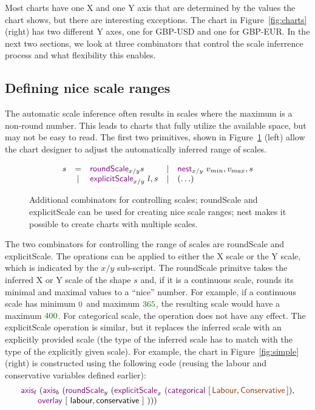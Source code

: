 \documentclass{jfp}
\newcommand{\num}[1]{\textcolor{numclr}{#1}}
\newcommand{\strf}[1]{\textnormal{\textcolor{strclr}{\sffamily #1}}}
\newcommand{\ident}[1]{\textnormal{\textcolor{idclr}{\sffamily #1}}}
\newcommand{\kvd}[1]{\textnormal{\textcolor{kvdclr}{\sffamily #1}}}
\begin{document}
Most charts have one X and one Y axis that are determined by the values the chart shows,
but there are interesting exceptions. The chart in Figure~\ref{fig:charts} (right)
has two different Y axes, one for GBP-USD and one for GBP-EUR. In the next two sections, we look at
three combinators that control the scale inferrence process and what flexibility this enables.

\subsection{Defining nice scale ranges}

The automatic scale inference often results in scales where the maximum is a non-round number.
This leads to charts that fully utilize the available space, but may not be easy to read.
The first two primitives, shown in Figure~\ref{fig:control} (left) allow the chart designer
to adjust the automatically inferred range of scales.

\begin{figure}
  \begin{equation*}
  \begin{array}{rclcl}
  s & = & \kvd{roundScale}_{x/y} s      &|& \kvd{nest}_{x/y}~v_{min}, v_{max}, s \\
    & | & \kvd{explicitScale}_{x/y}~l, s &|&  (\ldots)
  \end{array}
  \end{equation*}
  \caption{Additional combinators for controlling scales; \kvd{roundScale} and \kvd{explicitScale}
    can be used for creating nice scale ranges; \kvd{nest} makes it possible to create charts with
    multiple scales.}
\label{fig:control}
\end{figure}

The two combinators for controlling the range of scales are \kvd{roundScale} and \kvd{explicitScale}.
The oprations can be applied to either the X scale or the Y scale, which is indicated by the
$x/y$ sub-script. The \kvd{roundScale} primitve takes the inferred X or Y scale of the shape $s$
and, if it is a continuous scale, rounds its minimal and maximal values to a ``nice'' number.
For example, if a continuous scale has minimum $\num{0}$ and maximum $\num{365}$, the resulting
scale would have a maximum $\num{400}$. For categorical scale, the operation does not have any effect.
The \kvd{explicitScale} operation is similar, but it replaces the inferred scale with an explicitly
provided scale (the type of the inferred scale has to match with the type of the explicitly given
scale). For example, the chart in Figure~\ref{fig:simple} (right) is constructed using the
following code (reusing the \ident{labour} and \ident{conservative} variables defined earlier):
%
\begin{equation*}
\begin{array}{l}
\kvd{axis}_l~(\kvd{axis}_b~(\kvd{roundScale}_y~(\kvd{explicitScale}_x~(\kvd{categorical}~[\,\strf{Labour},\strf{Conservative}\,]),\\
\qquad \kvd{overlay}~[~\ident{labour}, \ident{conservative}~]~)))\\
\end{array}
\end{equation*}
\end{document}
